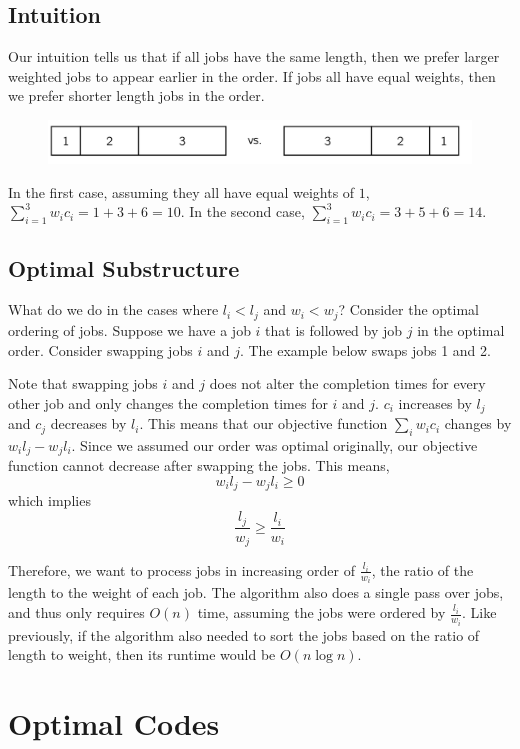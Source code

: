 \documentclass [12pt]{article}
\theoremstyle{definition}
\begin{document}
\subsection{Intuition}
Our intuition tells us that if all jobs have the same length, then we prefer larger weighted jobs to appear earlier in the order. If jobs all have equal weights, then we prefer shorter length jobs in the order.

\begin{figure}[h!]
    \centering
    \includegraphics[scale=0.5]{scheduling_intuition.png}
\end{figure}

In the first case, assuming they all have equal weights of $1$, $\sum^{3}_{i=1} w_ic_i = 1 + 3 + 6 = 10.$ In the second case, $\sum^{3}_{i=1} w_ic_i = 3 + 5 + 6 = 14.$

\subsection{Optimal Substructure}

What do we do in the cases where $l_i < l_j$ and $w_i < w_j$? Consider the optimal ordering of jobs. Suppose we have a job $i$ that is followed by job $j$ in the optimal order. Consider swapping jobs $i$ and $j$. The example below swaps jobs 1 and 2.

Note that swapping jobs $i$ and $j$ does not alter the completion times for every other job and only changes the completion times for $i$ and $j$. $c_i$ increases by $l_j$ and $c_j$ decreases by $l_i$. This means that our objective function $\sum_i w_ic_i$ changes by $w_il_j -w_jl_i$. Since we assumed our order was optimal originally, our objective function cannot decrease after swapping the jobs. This means,
$$
w_il_j - w_jl_i \geq 0
$$
which implies
$$
\frac{l_j}{w_j} \geq \frac{l_i}{w_i}
$$

Therefore, we want to process jobs in increasing order of $\frac{l_i}{w_i}$, the ratio of the length to the weight of each job. The algorithm also does a single pass over jobs, and thus only requires $O(n)$ time, assuming the jobs were ordered by $\frac{l_i}{w_i}$. Like previously, if the algorithm also needed to sort the jobs based on the ratio of length to weight, then its runtime would be $O(n \log n)$.

\section{Optimal Codes}
\end{document}

